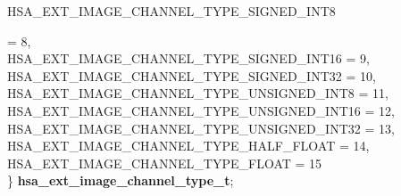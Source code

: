 \documentclass[final,oneside]{book}
\newcommand{\reftyp}[1]{#1}
\newcommand{\refenu}[1]{\reftyp{#1}}
\newenvironment{mylongtable}{\rowcolors{0}{lightgray}{lightgray}\longtable} {
\endlongtable}
\begin{document}
\begin{mylongtable}{@{}p{\textwidth}}
\hspace{1.7em}\hypertarget{group__ext-images_1ggaa143aa6feeaf24103b886c571ace568fa39b7795d032ee6afc6c701b25632b7c0}{\refenu{HSA_\-EXT_\-IMAGE_\-CHANNEL_\-TYPE_\-SIGNED_\-INT8}} = 8,\\
\hspace{1.7em}\hypertarget{group__ext-images_1ggaa143aa6feeaf24103b886c571ace568fa94b5591edcfac1939f541c48a6f84400}{\refenu{HSA_\-EXT_\-IMAGE_\-CHANNEL_\-TYPE_\-SIGNED_\-INT16}} = 9,\\
\hspace{1.7em}\hypertarget{group__ext-images_1ggaa143aa6feeaf24103b886c571ace568fab58308c224a7d513ecbf0ffd51846ff2}{\refenu{HSA_\-EXT_\-IMAGE_\-CHANNEL_\-TYPE_\-SIGNED_\-INT32}} = 10,\\
\hspace{1.7em}\hypertarget{group__ext-images_1ggaa143aa6feeaf24103b886c571ace568fad5a41c0a19a7cb34f4343db6cf757b7a}{\refenu{HSA_\-EXT_\-IMAGE_\-CHANNEL_\-TYPE_\-UNSIGNED_\-INT8}} = 11,\\
\hspace{1.7em}\hypertarget{group__ext-images_1ggaa143aa6feeaf24103b886c571ace568fa1779271b7ca06132b05918e5a72a2a85}{\refenu{HSA_\-EXT_\-IMAGE_\-CHANNEL_\-TYPE_\-UNSIGNED_\-INT16}} = 12,\\
\hspace{1.7em}\hypertarget{group__ext-images_1ggaa143aa6feeaf24103b886c571ace568faf925e28a04ef0162badd74c43b324ec5}{\refenu{HSA_\-EXT_\-IMAGE_\-CHANNEL_\-TYPE_\-UNSIGNED_\-INT32}} = 13,\\
\hspace{1.7em}\hypertarget{group__ext-images_1ggaa143aa6feeaf24103b886c571ace568fa71200bfc55d6373e117594a624472973}{\refenu{HSA_\-EXT_\-IMAGE_\-CHANNEL_\-TYPE_\-HALF_\-FLOAT}} = 14,\\
\hspace{1.7em}\hypertarget{group__ext-images_1ggaa143aa6feeaf24103b886c571ace568fa4b06498e72cfae3bffd55e5c7a483576}{\refenu{HSA_\-EXT_\-IMAGE_\-CHANNEL_\-TYPE_\-FLOAT}} = 15\\
\} \hypertarget{group__ext-images_1gaa143aa6feeaf24103b886c571ace568f}{\textbf{hsa_\-ext_\-image_\-channel_\-type_\-t}};\rule[-2ex]{0pt}{0pt}\end{mylongtable}
\end{document}
